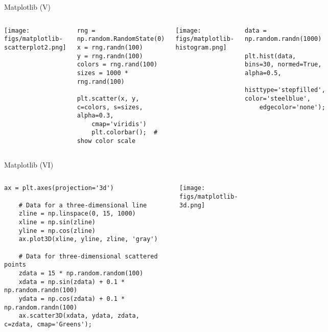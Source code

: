 \documentclass[10pt,compress]{beamer} %
\begin{document}
\begin{frame}[fragile]{Matplotlib (V)}
	\begin{columns}
	\texttt{[image: figs/matplotlib-scatterplot2.png]}\\

	\begin{exampleblock}{}
	\vspace{-0.2cm} 
\begin{lstlisting}[basicstyle=\tiny]
rng = np.random.RandomState(0)
x = rng.randn(100)
y = rng.randn(100)
colors = rng.rand(100)
sizes = 1000 * rng.rand(100)

plt.scatter(x, y, c=colors, s=sizes, alpha=0.3,
    cmap='viridis')
    plt.colorbar();  # show color scale
\end{lstlisting}
	\vspace{-0.2cm} 
	\end{exampleblock}

	\centering \texttt{[image: figs/matplotlib-histogram.png]}\\
	\begin{exampleblock}{}
	\vspace{-0.2cm} 
\begin{lstlisting}[basicstyle=\ttfamily\tiny]
data = np.random.randn(1000)

plt.hist(data, bins=30, normed=True, alpha=0.5,
    histtype='stepfilled', color='steelblue',
    edgecolor='none');
\end{lstlisting}
	\vspace{-0.2cm} 
	\end{exampleblock}
	\end{columns}
\end{frame}

\begin{frame}[fragile]{Matplotlib (VI)}
	\begin{columns}
	\begin{exampleblock}{}
	\vspace{-0.2cm} 
	\begin{lstlisting}[basicstyle=\tiny]
	ax = plt.axes(projection='3d')

	# Data for a three-dimensional line
	zline = np.linspace(0, 15, 1000)
	xline = np.sin(zline)
	yline = np.cos(zline)
	ax.plot3D(xline, yline, zline, 'gray')

	# Data for three-dimensional scattered points
	zdata = 15 * np.random.random(100)
	xdata = np.sin(zdata) + 0.1 * np.random.randn(100)
	ydata = np.cos(zdata) + 0.1 * np.random.randn(100)
	ax.scatter3D(xdata, ydata, zdata, c=zdata, cmap='Greens');
	\end{lstlisting}
	\vspace{-0.2cm} 
	\end{exampleblock}

	\centering \texttt{[image: figs/matplotlib-3d.png]}\\
	\end{columns}
\end{frame}
\end{document}
